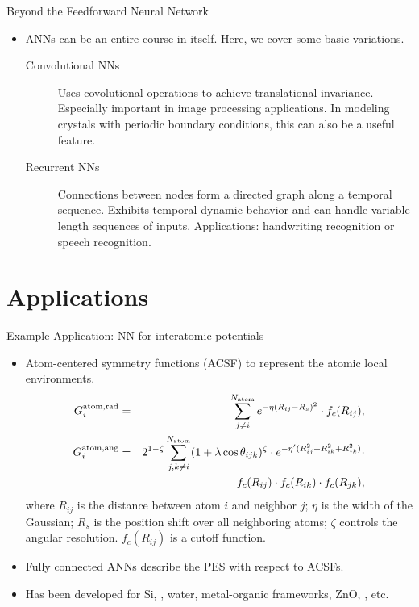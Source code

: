 \documentclass[aspectratio=169]{beamer}
\begin{document}
\begin{frame}{Beyond the Feedforward Neural Network}
    \begin{itemize}
        \item ANNs can be an entire course in itself. Here, we cover some basic variations.
        \begin{description}
        \item[Convolutional NNs] Uses covolutional operations to achieve translational invariance. Especially important in image processing applications. In modeling crystals with periodic boundary conditions, this can also be a useful feature.
        \item[Recurrent NNs] Connections between nodes form a directed graph along a temporal sequence. Exhibits temporal dynamic behavior and can handle variable length sequences of inputs. Applications: handwriting recognition or speech recognition.
        \end{description}
        
    \end{itemize}
\end{frame}


\section{Applications}


\begin{frame}{Example Application: NN for interatomic potentials}
    \begin{itemize}
        \item Atom-centered symmetry functions (ACSF)\cite{behlerAtomcenteredSymmetryFunctions2011} to represent the atomic local environments.
        \begin{eqnarray*}
            G_{i}^{\rm atom, \rm rad} & = & \sum_{j\neq i}^{N_{\rm atom}} e^{-\eta(R_{ij}-R_{s})^{2}} \cdot f_{c}(R_{ij}), \\
            G_{i}^{\rm atom, \rm ang} & = & 2^{1-\zeta}\sum_{j,k \neq i}^{N_{\rm atom}} (1 + \lambda \cos \theta_{ijk})^{\zeta} \cdot e^{-\eta^{\prime}(R_{ij}^{2}+R_{ik}^{2}+R_{jk}^{2})}\cdot\\
            & & f_{c}(R_{ij}) \cdot f_{c}(R_{ik}) \cdot f_{c}(R_{jk}),
        \end{eqnarray*}
        where $R_{ij}$ is the distance between atom $i$ and neighbor $j$; $\eta$ is the width of the Gaussian; $R_{s}$ is the position shift over all neighboring atoms; $\zeta$ controls the angular resolution. $f_{c}(R_{ij})$ is a cutoff function.    
        \item Fully connected ANNs describe the PES with respect to ACSFs.\cite{behlerHighDimensionalNeuralNetwork}
        \item Has been developed for Si, , water, metal-organic frameworks, ZnO, , etc.
    \end{itemize}
\end{frame}
\end{document}
